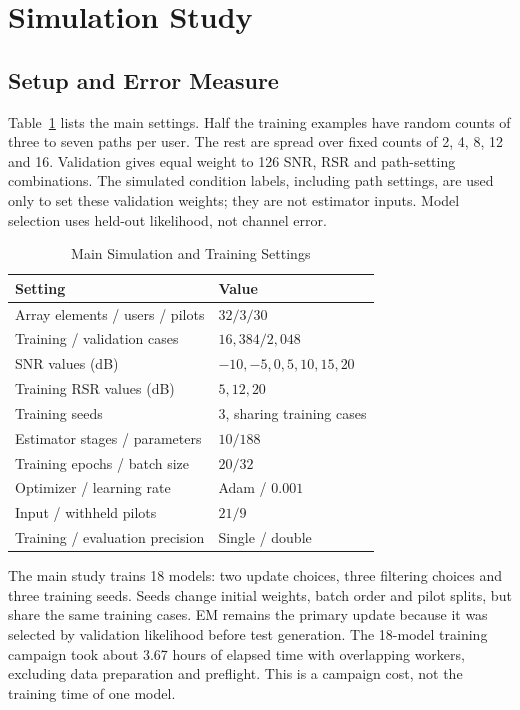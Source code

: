 \documentclass[journal]{IEEEtran}
\begin{document}
\section{Simulation Study}
\subsection{Setup and Error Measure}
Table~\ref{tab:setup} lists the main settings. Half the training examples
have random counts of three to seven paths per user. The rest are spread
over fixed counts of 2, 4, 8, 12 and 16. Validation gives equal weight to
126 SNR, RSR and path-setting combinations. The simulated condition labels,
including path settings, are used only to set these validation weights;
they are not estimator inputs. Model selection uses held-out likelihood,
not channel error.

\begin{table}[!t]
\caption{Main Simulation and Training Settings}
\label{tab:setup}
\centering\small
\begin{tabular}{@{}ll@{}}
\toprule
Setting & Value\\\midrule
Array elements / users / pilots & $32/3/30$\\
Training / validation cases & $16{,}384/2{,}048$\\
SNR values (dB) & $-10,-5,0,5,10,15,20$\\
Training RSR values (dB) & $5,12,20$\\
Training seeds & 3, sharing training cases\\
Estimator stages / parameters & $10/188$\\
Training epochs / batch size & $20/32$\\
Optimizer / learning rate & Adam / $0.001$\\
Input / withheld pilots & $21/9$\\
Training / evaluation precision & Single / double\\
\bottomrule
\end{tabular}
\end{table}

The main study trains 18 models: two update choices, three filtering
choices and three training seeds. Seeds change initial weights, batch
order and pilot splits, but share the same training cases. EM remains the
primary update because it was selected by validation likelihood before
test generation. The 18-model training campaign took about 3.67 hours of
elapsed time with overlapping workers, excluding data preparation and
preflight. This is a campaign cost, not the training time of one model.
\end{document}
